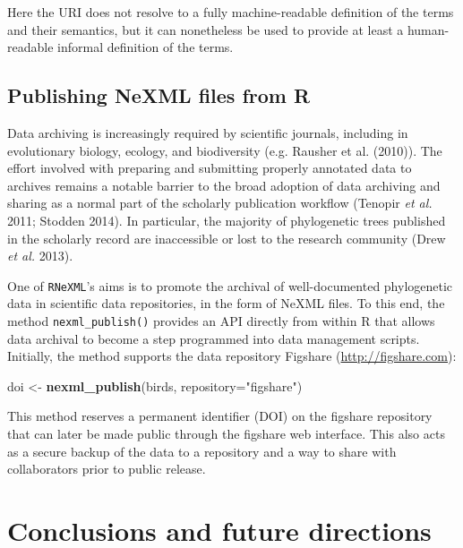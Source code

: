 \documentclass[author-year, review, 11pt]{elsarticle} %
\newenvironment{Shaded}{\begin{snugshade}}{\end{snugshade}}
\newcommand{\KeywordTok}[1]{\textcolor[rgb]{0.13,0.29,0.53}{\textbf{{#1}}}}
\newcommand{\DataTypeTok}[1]{\textcolor[rgb]{0.13,0.29,0.53}{{#1}}}
\newcommand{\StringTok}[1]{\textcolor[rgb]{0.31,0.60,0.02}{{#1}}}
\newcommand{\NormalTok}[1]{{#1}}
\begin{document}
Here the URI does not resolve to a fully machine-readable definition of
the terms and their semantics, but it can nonetheless be used to provide
at least a human-readable informal definition of the terms.

\subsection{Publishing NeXML files from
R}\label{publishing-nexml-files-from-r}

Data archiving is increasingly required by scientific journals,
including in evolutionary biology, ecology, and biodiversity (e.g.
Rausher et al. (2010)). The effort involved with preparing and
submitting properly annotated data to archives remains a notable barrier
to the broad adoption of data archiving and sharing as a normal part of
the scholarly publication workflow (Tenopir \emph{et al.} 2011; Stodden
2014). In particular, the majority of phylogenetic trees published in
the scholarly record are inaccessible or lost to the research community
(Drew \emph{et al.} 2013).

One of \texttt{RNeXML}'s aims is to promote the archival of
well-documented phylogenetic data in scientific data repositories, in
the form of NeXML files. To this end, the method
\texttt{nexml\_publish()} provides an API directly from within R that
allows data archival to become a step programmed into data management
scripts. Initially, the method supports the data repository Figshare
(\url{http://figshare.com}):

\begin{Shaded}
\begin{Highlighting}[]
\NormalTok{doi <-}\StringTok{ }\KeywordTok{nexml_publish}\NormalTok{(birds, }\DataTypeTok{repository=}\StringTok{"figshare"}\NormalTok{)}
\end{Highlighting}
\end{Shaded}

This method reserves a permanent identifier (DOI) on the figshare
repository that can later be made public through the figshare web
interface. This also acts as a secure backup of the data to a repository
and a way to share with collaborators prior to public release.

\section{Conclusions and future
directions}\label{conclusions-and-future-directions}
\end{document}
